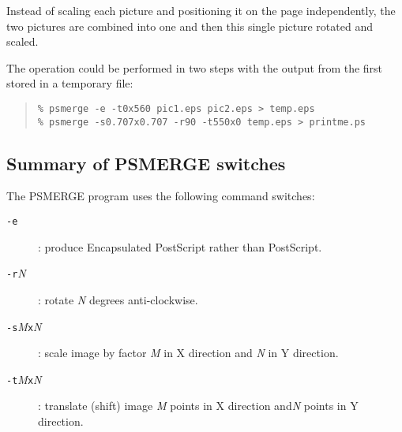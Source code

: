 \documentclass[twoside,11pt]{article}
\newcommand{\xlabel}[1]{}
\begin{document}
Instead of scaling each picture and positioning it on the page
independently, the two pictures are combined into one and then this
single picture rotated and scaled.

The operation could be performed in two steps with the output from
the first stored in a temporary file:

\begin{quote}\begin{verbatim}
% psmerge -e -t0x560 pic1.eps pic2.eps > temp.eps
% psmerge -s0.707x0.707 -r90 -t550x0 temp.eps > printme.ps
\end{verbatim}\end{quote}

\subsection{\xlabel{summary_of_psmerge_switches}Summary of PSMERGE switches}
\label{summary_of_switches}

The PSMERGE program uses the following command switches:

\begin{description}

\item[\texttt{-e}]: produce Encapsulated PostScript rather than PostScript.

\item[\texttt{-r}\textit{N}]: rotate \textit{N} degrees anti-clockwise.

\item[\texttt{-s}\textit{M}\texttt{x}\textit{N}]: scale image by factor
\textit{M} in X direction and \textit{N} in Y direction.

\item[\texttt{-t}\textit{M}\texttt{x}\textit{N}]: translate (shift)
image \textit{M} points in X direction and\textit{N} points in Y
direction.

\end{description}

\end{document}
